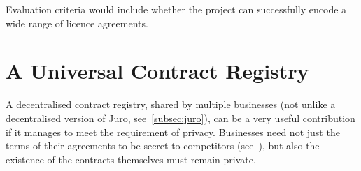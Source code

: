Evaluation criteria would include whether the project can successfully encode a wide range of
licence agreements.


\section{A Universal Contract Registry}\label{sec:contract-registry}

A decentralised contract registry, shared by multiple businesses (not unlike a decentralised version
of Juro, see~\ref{subsec:juro}), can be a very useful contribution if it manages to meet the
requirement of privacy.
Businesses need not just the terms of their agreements to be secret to competitors
(see~\cite[]{economistIU2016licence}), but also the existence of the contracts
themselves must remain private.
